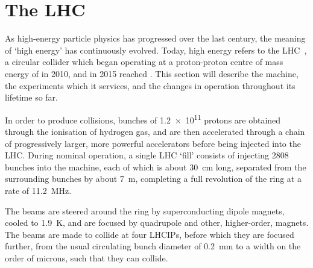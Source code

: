 \chapter{The \acl{LHC}}
\label{chap:intro:lhc}

As high-energy particle physics has progressed over the last century, the 
meaning of `high energy' has continuously evolved.
Today, high energy refers to the \acl{LHC}~\cite{Bruning:2004ej}, a circular 
collider which began operating at a proton-proton centre of mass energy of 
 in 2010, and in 2015 reached .
This section will describe the machine, the experiments which it services, and 
the changes in operation throughout its lifetime so far.

In order to produce collisions, bunches of \num{1.2e11} protons are obtained 
through the ionisation of hydrogen gas, and are then accelerated through a 
chain of progressively larger, more powerful accelerators before being injected 
into the \ac{LHC}.
During nominal operation, a single \ac{LHC} `fill' consists of injecting 2808 
bunches into the machine, each of which is about \SI{30}{\centi\metre} long, 
separated from the surrounding bunches by about \SI{7}{\metre}, completing a 
full revolution of the ring at a rate of \SI{11.2}{\mega\hertz}.

The beams are steered around the ring by superconducting dipole magnets, cooled 
to \SI{1.9}{\kelvin}, and are focused by quadrupole and other, higher-order, 
magnets.
The beams are made to collide at four \acp{LHCIP}, before which they are 
focused further, from the usual circulating bunch diameter of 
\SI{0.2}{\milli\metre} to a width on the order of microns, such that they can 
collide.

